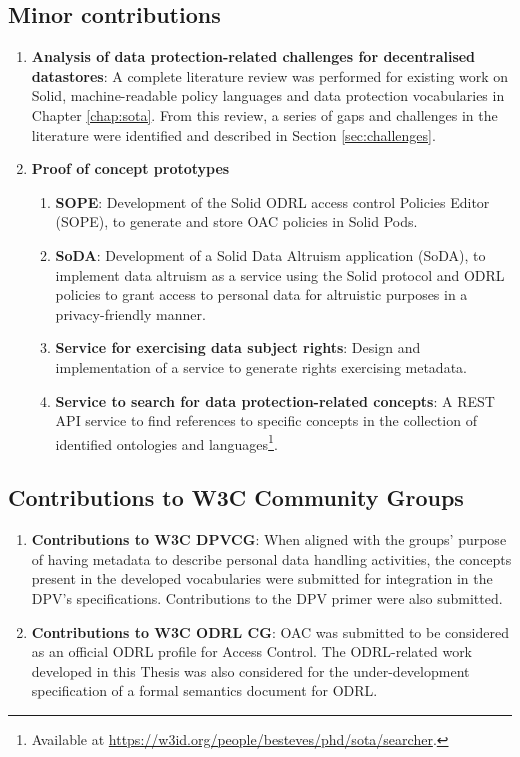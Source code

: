 \subsection{Minor contributions}
\label{sec:contr_minor}

\begin{enumerate}
    \item [\textbf{C3.}] \textbf{Analysis of data protection-related challenges for decentralised datastores}: A complete literature review was performed for existing work on Solid, machine-readable policy languages and data protection vocabularies in Chapter \ref{chap:sota}. From this review, a series of gaps and challenges in the literature were identified and described in Section \ref{sec:challenges}.
    \item [\textbf{C4.}] \textbf{Proof of concept prototypes}
    \begin{enumerate}
        \item [\textbf{C4.1.}] \textbf{SOPE}: Development of the Solid ODRL access control Policies Editor (SOPE), to generate and store OAC policies in Solid Pods.
        \item [\textbf{C4.2.}] \textbf{SoDA}: Development of a Solid Data Altruism application (SoDA), to implement data altruism as a service using the Solid protocol and ODRL policies to grant access to personal data for altruistic purposes in a privacy-friendly manner.
        \item [\textbf{C4.3.}] \textbf{Service for exercising data subject rights}: Design and implementation of a service to generate rights exercising metadata.
        \item [\textbf{C4.4.}] \textbf{Service to search for data protection-related concepts}: A REST API service to find references to specific concepts in the collection of identified ontologies and languages\footnote{Available at \url{https://w3id.org/people/besteves/phd/sota/searcher}.}.
    \end{enumerate}
\end{enumerate}

\subsection{Contributions to W3C Community Groups}
\label{sec:contr_w3c}

\begin{enumerate}
    \item [\textbf{C5.}] \textbf{Contributions to W3C DPVCG}: When aligned with the groups' purpose of having metadata to describe personal data handling activities, the concepts present in the developed vocabularies were submitted for integration in the DPV's specifications. Contributions to the DPV primer were also submitted.
    \item [\textbf{C6.}] \textbf{Contributions to W3C ODRL CG}: OAC was submitted to be considered as an official ODRL profile for Access Control. The ODRL-related work developed in this Thesis was also considered for the under-development specification of a formal semantics document for ODRL.
\end{enumerate}